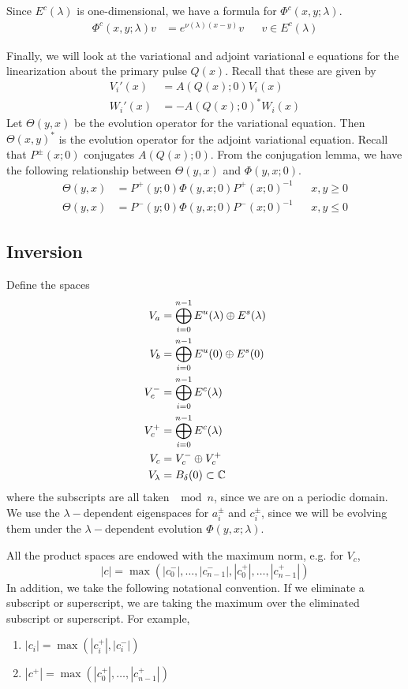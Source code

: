 \documentclass[thesis.tex]{subfiles}
\begin{document}
Since $E^c(\lambda)$ is one-dimensional, we have a formula for $\Phi^c(x, y; \lambda)$.
\begin{align*}
\Phi^c(x, y; \lambda) v &= e^{\nu(\lambda)(x - y)} v && v \in E^c(\lambda)
\end{align*}

Finally, we will look at the variational and adjoint variational e
equations for the linearization about the primary pulse $Q(x)$. Recall that these are given by 
\begin{align*}
V_i'(x) &= A(Q(x); 0) V_i(x) \\
W_i'(x) &= -A(Q(x); 0)^* W_i(x)
\end{align*}
Let $\Theta(y, x)$ be the evolution operator for the variational equation. Then $\Theta(x, y)^*$ is the evolution operator for the adjoint variational equation. Recall that $P^\pm(x; 0)$ conjugates $A(Q(x); 0)$. From the conjugation lemma, we have the following relationship between $\Theta(y, x)$ and $\Phi(y, x; 0)$.
\begin{align*}
\Theta(y, x) &= P^+(y; 0) \Phi(y, x; 0) P^+(x; 0)^{-1} && x, y \geq 0 \\
\Theta(y, x) &= P^-(y; 0) \Phi(y, x; 0) P^-(x; 0)^{-1} && x, y \leq 0
\end{align*}

\subsection{Inversion}

Define the spaces
\begin{align*}
V_a &= \bigoplus_{i=0}^{n-1} E^u(\lambda) \oplus E^s(\lambda) \\
V_b &= \bigoplus_{i=0}^{n-1} E^u(0) \oplus E^s(0) \\
V_c^- &= \bigoplus_{i=0}^{n-1} E^c(\lambda) \\
V_c^+ &= \bigoplus_{i=0}^{n-1} E^c(\lambda) \\
V_c &= V_c^- \oplus V_c^+ \\
V_\lambda &= B_\delta(0) \subset {\mathbb C}
\end{align*}
where the subscripts are all taken $\mod n$, since we are on a periodic domain. We use the $\lambda-$dependent eigenspaces for $a_i^\pm$ and $c_i^\pm$, since we will be evolving them under the $\lambda-$dependent evolution $\Phi(y, x; \lambda)$.

All the product spaces are endowed with the maximum norm, e.g. for $V_c$, 
\[
|c| = \max(|c_0^-|, \dots, |c_{n-1}^-|, |c_0^+|, \dots, |c_{n-1}^+|)
\]
In addition, we take the following notational convention. If we eliminate a subscript or superscript, we are taking the maximum over the eliminated subscript or superscript. For example,
\begin{enumerate}
	\item $|c_i| = \max(|c_i^+|, |c_i^-|)$ 
	\item $|c^+| = \max(|c_0^+|, \dots, |c_{n-1}^+|)$
\end{enumerate}
\end{document}
